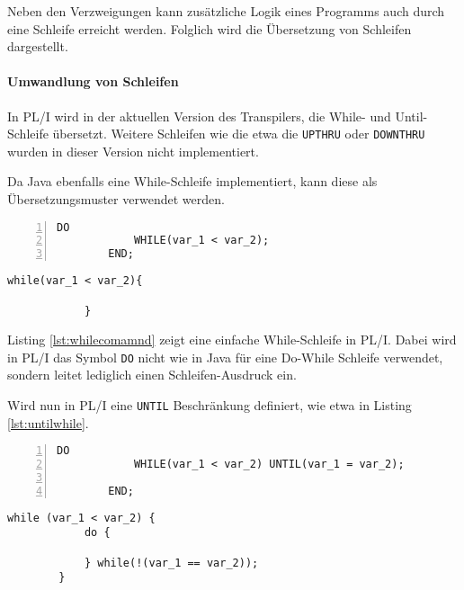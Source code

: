 Neben den Verzweigungen kann zusätzliche Logik eines Programms auch durch eine Schleife erreicht werden.
Folglich wird die Übersetzung von Schleifen dargestellt.

\paragraph{Umwandlung von Schleifen}
In PL/I wird in der aktuellen Version des Transpilers, die  While- und Until-Schleife übersetzt.
Weitere Schleifen wie die etwa die \verb+UPTHRU+ oder \verb+DOWNTHRU+ wurden in dieser Version nicht implementiert.

Da Java ebenfalls eine While-Schleife implementiert, kann diese als Übersetzungsmuster verwendet werden.

\begin{minipage}[b]{0.5\linewidth}
	\centering
	\lstset{language=PL/I,label=SliceExaple}
	\begin{lstlisting}[frame=single, numbers=left, mathescape,%
		caption={Transformation deiner If-Else-Statements}, label={lst:whilecomamnd}]
		DO 
			WHILE(var_1 < var_2);
		END;
	\end{lstlisting}
\end{minipage}
\hspace{0.5cm}
\begin{minipage}[b]{0.5\linewidth}
	\centering
	\lstset{language=Java,label=SliceExaple}
	\begin{lstlisting}[frame=single, mathescape,%
		title={}]
			while(var_1 < var_2){
				
			}
	\end{lstlisting}
\end{minipage} 

Listing \ref{lst:whilecomamnd} zeigt eine einfache While-Schleife in PL/I.
Dabei wird in PL/I das Symbol \verb+DO+ nicht wie in Java für eine Do-While
Schleife verwendet, sondern leitet lediglich einen Schleifen-Ausdruck ein.

Wird nun in PL/I eine \verb+UNTIL+ Beschränkung definiert, wie etwa in Listing
\ref{lst:untilwhile}.

\begin{minipage}[b]{0.5\linewidth}
	\centering
	\lstset{language=PL/I,label=SliceExaple}
	\begin{lstlisting}[frame=single, numbers=left, mathescape,%
		caption={Transformation deiner If-Else-Statements}, label={lst:untilwhile}]
		DO 
			WHILE(var_1 < var_2) UNTIL(var_1 = var_2);
				
		END;
	\end{lstlisting}
\end{minipage}
\hspace{0.5cm}
\begin{minipage}[b]{0.5\linewidth}
	\centering
	\lstset{language=Java,label=SliceExaple}
	\begin{lstlisting}[frame=single, mathescape,%
		title={}]
		while (var_1 < var_2) {
			do {
				
			} while(!(var_1 == var_2));
		}
	\end{lstlisting}
\end{minipage} 

